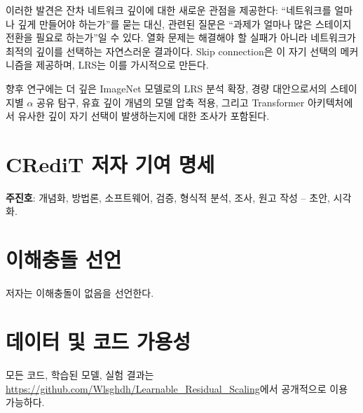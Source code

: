 \documentclass[preprint,12pt]{elsarticle}
\begin{document}
이러한 발견은 잔차 네트워크 깊이에 대한 새로운 관점을 제공한다: ``네트워크를 얼마나 깊게 만들어야 하는가''를 묻는 대신, 관련된 질문은 ``과제가 얼마나 많은 스테이지 전환을 필요로 하는가''일 수 있다. 열화 문제는 해결해야 할 실패가 아니라 네트워크가 최적의 깊이를 선택하는 자연스러운 결과이다. Skip connection은 이 자기 선택의 메커니즘을 제공하며, LRS는 이를 가시적으로 만든다.

향후 연구에는 더 깊은 ImageNet 모델로의 LRS 분석 확장, 경량 대안으로서의 스테이지별 $\alpha$ 공유 탐구, 유효 깊이 개념의 모델 압축 적용, 그리고 Transformer 아키텍처에서 유사한 깊이 자기 선택이 발생하는지에 대한 조사가 포함된다.

\section*{CRediT 저자 기여 명세}
\textbf{주진호}: 개념화, 방법론, 소프트웨어, 검증, 형식적 분석, 조사, 원고 작성 -- 초안, 시각화.

\section*{이해충돌 선언}
저자는 이해충돌이 없음을 선언한다.

\section*{데이터 및 코드 가용성}
모든 코드, 학습된 모델, 실험 결과는 \url{https://github.com/Wlsghdh/Learnable_Residual_Scaling}에서 공개적으로 이용 가능하다.


\end{document}
